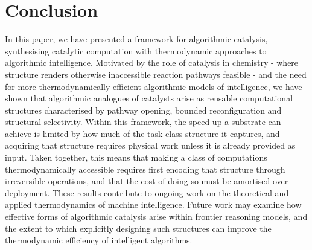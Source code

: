 \documentclass[runningheads]{llncs}
\begin{document}
\section{Conclusion}
\label{sec:conclusion}
In this paper, we have presented a framework for algorithmic
catalysis, synthesising catalytic computation with thermodynamic
approaches to algorithmic intelligence. Motivated by the role of
catalysis in chemistry - where structure renders otherwise
inaccessible reaction pathways feasible - and the need for more thermodynamically-efficient algorithmic models of intelligence, we have shown that
algorithmic analogues of catalysts arise as reusable computational
structures characterised by pathway opening, bounded
reconfiguration and structural selectivity. Within this framework, the speed-up a substrate can achieve is
limited by how much of the task class structure it captures, and
acquiring that structure requires physical work unless it is
already provided as input. Taken together, this means that making a
class of computations thermodynamically accessible requires first
encoding that structure through irreversible operations, and that
the cost of doing so must be amortised over deployment. These results contribute to ongoing work on the theoretical and applied thermodynamics of machine
intelligence. Future work may examine how effective forms of
algorithmic catalysis arise within frontier reasoning models, and
the extent to which explicitly designing such structures can improve
the thermodynamic efficiency of intelligent algorithms.



\end{document}
